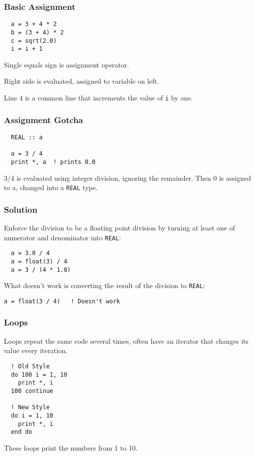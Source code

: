 \begin{frame}[fragile]
  \frametitle{Basic Assignment}

  \begin{lstlisting}
  a = 3 + 4 * 2
  b = (3 + 4) * 2
  c = sqrt(2.0)
  i = i + 1
  \end{lstlisting}

  Single equals sign is assignment operator. 

  Right side is evaluated, assigned to variable on left.

  Line 4 is a common line that increments the value of \texttt{i} by one.

\end{frame}

\begin{frame}[fragile]
  \frametitle{Assignment Gotcha}

  \begin{lstlisting}
  REAL :: a

  a = 3 / 4
  print *, a  ! prints 0.0
  \end{lstlisting}

  3/4 is evaluated using integer division, ignoring the remainder.
  Then 0 is assigned to a, changed into a \texttt{REAL} type.

\end{frame}

\begin{frame}[fragile]
  \frametitle{Solution}

  Enforce the division to be a floating point division by turning
  at least one of numerator and denominator into \texttt{REAL}:

  \begin{lstlisting}
  a = 3.0 / 4
  a = float(3) / 4
  a = 3 / (4 * 1.0)
  \end{lstlisting}

  What doesn't work is converting the result of the division to \texttt{REAL}:

  \begin{lstlisting}[numbers=none]
  a = float(3 / 4)   ! Doesn't work
  \end{lstlisting}

\end{frame}

\begin{frame}[fragile]
  \frametitle{Loops}

  Loops repeat the same code several times, often have an iterator that changes
  its value every iteration.

  \begin{lstlisting}
  ! Old Style
  do 100 i = 1, 10
    print *, i
  100 continue

  ! New Style
  do i = 1, 10
    print *, i
  end do
  \end{lstlisting}
  These loops print the numbers from 1 to 10.

\end{frame}

